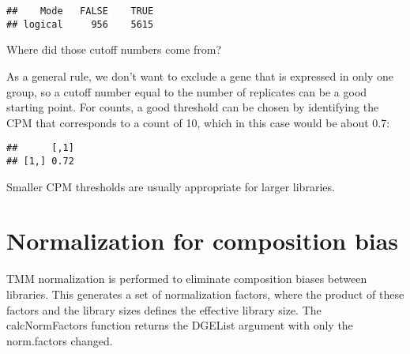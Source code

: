 \documentclass[
]{book}
\newenvironment{Shaded}{\begin{snugshade}}{\end{snugshade}}
\newcommand{\DecValTok}[1]{\textcolor[rgb]{0.00,0.00,0.81}{#1}}
\newcommand{\FunctionTok}[1]{\textcolor[rgb]{0.13,0.29,0.53}{\textbf{#1}}}
\newcommand{\NormalTok}[1]{#1}
\newcommand{\OtherTok}[1]{\textcolor[rgb]{0.56,0.35,0.01}{#1}}
\newcommand{\SpecialCharTok}[1]{\textcolor[rgb]{0.81,0.36,0.00}{\textbf{#1}}}
\begin{document}
\begin{verbatim}
##    Mode   FALSE    TRUE 
## logical     956    5615
\end{verbatim}

Where did those cutoff numbers come from?

As a general rule, we don't want to exclude a gene that is expressed in
only one group, so a cutoff number equal to the number of replicates can
be a good starting point. For counts, a good threshold can be chosen by
identifying the CPM that corresponds to a count of 10, which in this
case would be about 0.7:

\begin{Shaded}
\end{Shaded}

\begin{verbatim}
##      [,1]
## [1,] 0.72
\end{verbatim}

Smaller CPM thresholds are usually appropriate for larger libraries.

\hypertarget{normalization-for-composition-bias}{%
\section{Normalization for composition bias}\label{normalization-for-composition-bias}}

TMM normalization is performed to eliminate composition biases between
libraries. This generates a set of normalization factors, where the
product of these factors and the library sizes defines the effective
library size. The calcNormFactors function returns the DGEList argument
with only the norm.factors changed.

\begin{Shaded}
\end{Shaded}
\end{document}
